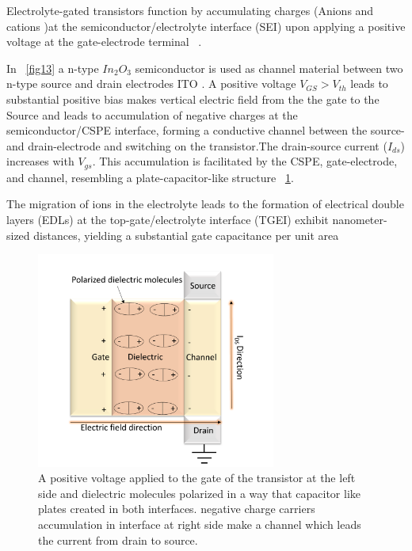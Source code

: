 Electrolyte-gated transistors function by accumulating charges (Anions and cations )at the semiconductor/electrolyte interface (SEI) upon applying a positive voltage at the gate-electrode terminal ~\cite{ref75}. 

In ~\ref{fig13} a n-type $In_2O_3$ 
semiconductor is used as channel material between two n-type source and drain electrodes ITO .
A positive voltage $V_{GS}> V_{th}$ leads to  substantial positive bias makes vertical electric field from the the gate to the Source and leads to accumulation of negative charges at the semiconductor/CSPE interface, forming a conductive channel between the source- and drain-electrode and switching on the transistor.The drain-source current ($I_{ds}$) increases with $V_{gs}$. This accumulation is facilitated by the CSPE, gate-electrode, and channel, resembling a plate-capacitor-like structure ~\ref{fig15}.

The migration of ions in the electrolyte leads to the formation of electrical double layers (EDLs) at the top-gate/electrolyte interface (TGEI) exhibit nanometer-sized distances, yielding a substantial gate capacitance per unit area ~\cite{ref74} 
 


\begin{figure}[h!]
\centering
\includegraphics[width=0.7\textwidth]{figures/fig15.png}
\caption[Example of caption.]{A positive voltage applied to the gate of the transistor at the left side and dielectric molecules polarized in a way that capacitor like plates created in both interfaces. negative charge carriers accumulation in interface at right side make a channel which leads the current from drain to source.\label{fig15}}
\end{figure}


